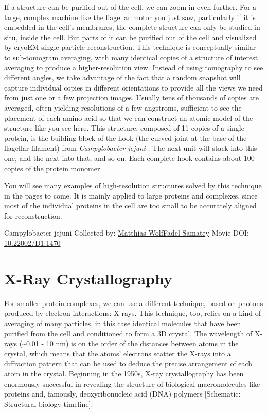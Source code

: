 \documentclass[]{tufte-book}
\begin{document}
If a structure can be purified out of the cell, we can zoom in even further. For a large, complex machine like the flagellar motor you just saw, particularly if it is embedded in the cell's membranes, the complete structure can only be studied in situ, inside the cell. But parts of it can be purified out of the cell and visualized by cryoEM single particle reconstruction. This technique is conceptually similar to sub-tomogram averaging, with many identical copies of a structure of interest averaging to produce a higher-resolution view. Instead of using tomography to see different angles, we take advantage of the fact that a random snapshot will capture individual copies in different orientations to provide all the views we need from just one or a few projection images. Usually tens of thousands of copies are averaged, often yielding resolutions of a few angstroms, sufficient to see the placement of each amino acid so that we can construct an atomic model of the structure like you see here. This structure, composed of 11 copies of a single protein, is the building block of the hook (the curved joint at the base of the flagellar filament) from \emph{Campylobacter jejuni} \citep{matsunami2016}. The next unit will stack into this one, and the next into that, and so on. Each complete hook contains about 100 copies of the protein monomer.

You will see many examples of high-resolution structures solved by this technique in the pages to come. It is mainly applied to large proteins and complexes, since most of the individual proteins in the cell are too small to be accurately aligned for reconstruction.



\hypertarget{htmlwidget-e78664bc8c88aab45779}{}

\label{fig:1-8}Campylobacter jejuni Collected by: \protect\hyperlink{matthias_wolffadel_samatey}{Matthias WolfFadel Samatey} Movie DOI: \href{https://doi.org/10.22002/D1.1470}{10.22002/D1.1470}

\hypertarget{x-ray-crystallography}{%
\section{X-Ray Crystallography}\label{x-ray-crystallography}}

For smaller protein complexes, we can use a different technique, based on photons produced by electron interactions: X-rays. This technique, too, relies on a kind of averaging of many particles, in this case identical molecules that have been purified from the cell and conditioned to form a 3D crystal. The wavelength of X-rays (\textasciitilde{}0.01 - 10 nm) is on the order of the distances between atoms in the crystal, which means that the atoms' electrons scatter the X-rays into a diffraction pattern that can be used to deduce the precise arrangement of each atom in the crystal. Beginning in the 1950s, X-ray crystallography has been enormously successful in revealing the structure of biological macromolecules like proteins and, famously, deoxyribonucleic acid (DNA) polymers {[}Schematic: Structural biology timeline{]}.
\end{document}

